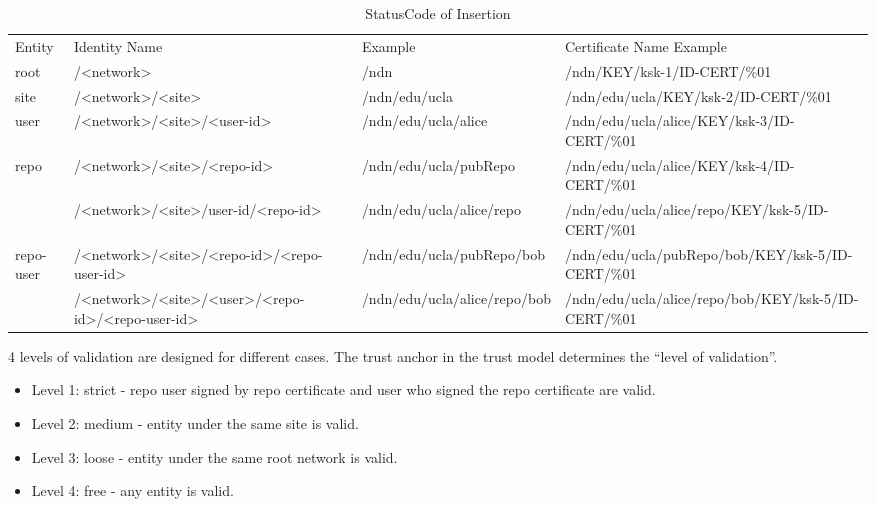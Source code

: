 \documentclass{acm_proc_article-sp}
\begin{document}
\begin{table*}[!hbp]

\centering
\small

\begin{tabularx}{\textwidth}{l | X | l | X}

\hline
Entity & Identity Name & Example & Certificate Name Example \\
root & /<network> & /ndn & /ndn/KEY/ksk-1/ID-CERT/\%01 \\
site & /<network>/<site> & /ndn/edu/ucla & /ndn/edu/ucla/KEY/ksk-2/ID-CERT/\%01 \\
user & /<network>/<site>/<user-id> & /ndn/edu/ucla/alice & /ndn/edu/ucla/alice/KEY/ksk-3/ID-CERT/\%01 \\
\multirow{2}{*}{repo} & /<network>/<site>/<repo-id> & /ndn/edu/ucla/pubRepo & /ndn/edu/ucla/alice/KEY/ksk-4/ID-CERT/\%01 \\
& /<network>/<site>/user-id/<repo-id> &  /ndn/edu/ucla/alice/repo & /ndn/edu/ucla/alice/repo/KEY/ksk-5/ID-CERT/\%01 \\
\multirow{2}{*}{repo-user} & /<network>/<site>/<repo-id>/<repo-user-id>  & /ndn/edu/ucla/pubRepo/bob & /ndn/edu/ucla/pubRepo/bob/KEY/ksk-5/ID-CERT/\%01 \\

& /<network>/<site>/<user>/<repo-id>/<repo-user-id> & /ndn/edu/ucla/alice/repo/bob & /ndn/edu/ucla/alice/repo/bob/KEY/ksk-5/ID-CERT/\%01 \\
\hline

\end{tabularx}
\caption{StatusCode of Insertion}
\end{table*}

4 levels of validation are designed for different cases. The trust anchor in the trust model determines the ``level of validation''.

\begin{itemize}

\item Level 1: strict - repo user signed by repo certificate and user who signed the repo certificate are valid.

\item Level 2: medium - entity under the same site is valid.

\item Level 3: loose - entity under the same root network is valid.

\item Level 4: free - any entity is valid.

\end{itemize}
\end{document}
